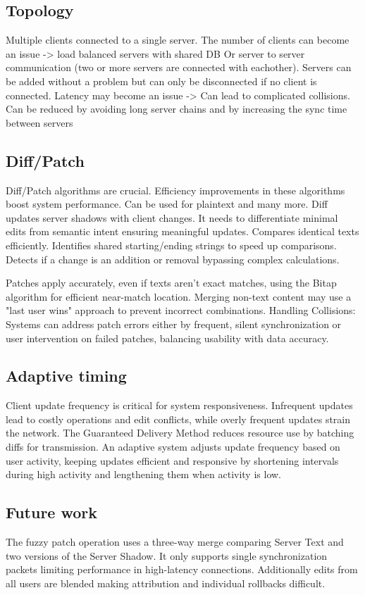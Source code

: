 \subsection{Topology}

Multiple clients connected to a single server.
The number of clients can become an issue -> load balanced servers with shared DB
Or server to server communication (two or more servers are connected with eachother). Servers can be added without a problem but can only be disconnected if no client is connected.
Latency may become an issue -> Can lead to complicated collisions. 
Can be reduced by avoiding long server chains and by increasing the sync time between servers

\subsection{Diff/Patch}
Diff/Patch algorithms are crucial. Efficiency improvements in these algorithms boost system performance. Can be used for plaintext and many more. Diff updates server shadows with client changes. It needs to differentiate minimal edits from semantic intent ensuring meaningful updates. Compares identical texts efficiently. Identifies shared starting/ending strings to speed up comparisons. Detects if a change is an addition or removal bypassing complex calculations.


Patches apply accurately, even if texts aren’t exact matches, using the Bitap algorithm for efficient near-match location. Merging non-text content may use a "last user wins" approach to prevent incorrect combinations.
Handling Collisions: Systems can address patch errors either by frequent, silent synchronization or user intervention on failed patches, balancing usability with data accuracy.

\subsection{Adaptive timing}
Client update frequency is critical for system responsiveness. Infrequent updates lead to costly operations and edit conflicts, while overly frequent updates strain the network. The Guaranteed Delivery Method reduces resource use by batching diffs for transmission. An adaptive system adjusts update frequency based on user activity, keeping updates efficient and responsive by shortening intervals during high activity and lengthening them when activity is low.

\subsection{Future work}
The fuzzy patch operation uses a three-way merge comparing Server Text and two versions of the Server Shadow. It only supports single synchronization packets limiting performance in high-latency connections. Additionally edits from all users are blended making attribution and individual rollbacks difficult.

